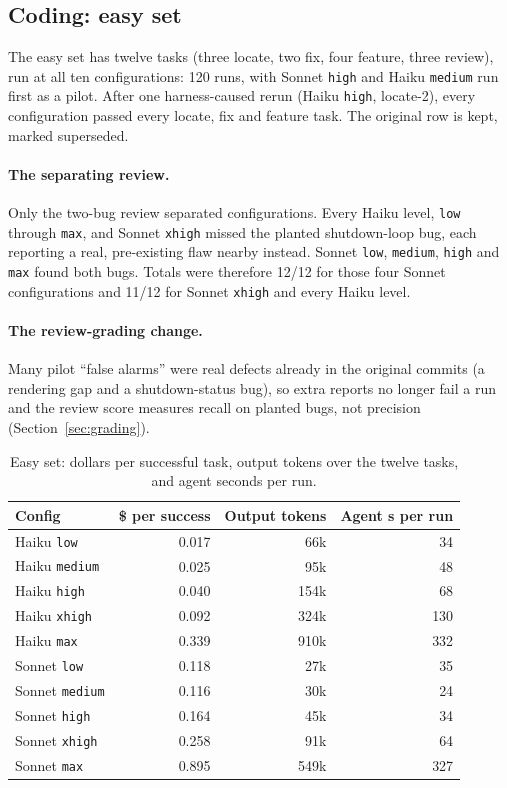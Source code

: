 \subsection{Coding: easy set}\label{sec:exp-easy}

The easy set has twelve tasks (three locate, two fix, four feature, three review), run at all ten configurations: 120 runs, with Sonnet \texttt{high} and Haiku \texttt{medium} run first as a pilot. After one harness-caused rerun (Haiku \texttt{high}, locate-2), every configuration passed every locate, fix and feature task. The original row is kept, marked superseded.

\paragraph{The separating review.} Only the two-bug review separated configurations. Every Haiku level, \texttt{low} through \texttt{max}, and Sonnet \texttt{xhigh} missed the planted shutdown-loop bug, each reporting a real, pre-existing flaw nearby instead. Sonnet \texttt{low}, \texttt{medium}, \texttt{high} and \texttt{max} found both bugs. Totals were therefore 12/12 for those four Sonnet configurations and 11/12 for Sonnet \texttt{xhigh} and every Haiku level.

\paragraph{The review-grading change.} Many pilot ``false alarms'' were real defects already in the original commits (a rendering gap and a shutdown-status bug), so extra reports no longer fail a run and the review score measures recall on planted bugs, not precision (Section~\ref{sec:grading}).

\begin{table}[H]
\centering
\caption{Easy set: dollars per successful task, output tokens over the twelve tasks, and agent seconds per run.}
\label{tab:easy-cost}
\small
\begin{tabular}{l r r r}
\toprule
\textbf{Config} & \textbf{\$ per success} & \textbf{Output tokens} & \textbf{Agent s per run} \\
\midrule
Haiku \texttt{low}     & 0.017 & 66k  & 34  \\
Haiku \texttt{medium}  & 0.025 & 95k  & 48  \\
Haiku \texttt{high}    & 0.040 & 154k & 68  \\
Haiku \texttt{xhigh}   & 0.092 & 324k & 130 \\
Haiku \texttt{max}     & 0.339 & 910k & 332 \\
Sonnet \texttt{low}    & 0.118 & 27k  & 35  \\
Sonnet \texttt{medium} & 0.116 & 30k  & 24  \\
Sonnet \texttt{high}   & 0.164 & 45k  & 34  \\
Sonnet \texttt{xhigh}  & 0.258 & 91k  & 64  \\
Sonnet \texttt{max}    & 0.895 & 549k & 327 \\
\bottomrule
\end{tabular}
\end{table}

